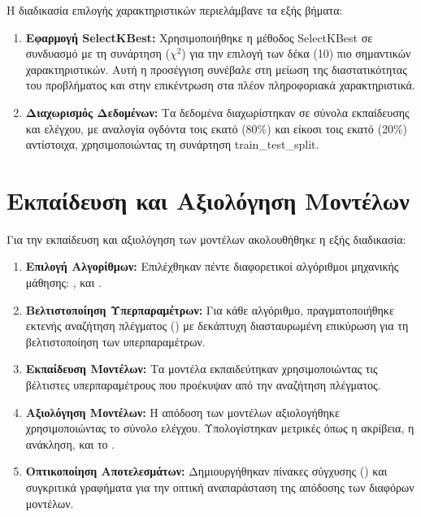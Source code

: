 Η διαδικασία επιλογής χαρακτηριστικών περιελάμβανε τα εξής βήματα:
\begin{enumerate}
  \item
    \textbf{Εφαρμογή \textlatin{SelectKBest}:} Χρησιμοποιήθηκε η μέθοδος
    \textlatin{SelectKBest} σε συνδυασμό με τη συνάρτηση (${\chi}^2$) για
    την επιλογή των δέκα (10) πιο σημαντικών χαρακτηριστικών. Αυτή η
    προσέγγιση συνέβαλε στη μείωση της διαστατικότητας του προβλήματος και
    στην επικέντρωση στα πλέον πληροφοριακά χαρακτηριστικά.

  \item
    \textbf{Διαχωρισμός Δεδομένων:} Τα δεδομένα διαχωρίστηκαν σε σύνολα
    εκπαίδευσης και ελέγχου, με αναλογία ογδόντα τοις εκατό (80\%) και
    είκοσι τοις εκατό (20\%) αντίστοιχα, χρησιμοποιώντας τη συνάρτηση
    \textlatin{train\_test\_split}.
\end{enumerate}

\section{Εκπαίδευση και Αξιολόγηση Μοντέλων}

Για την εκπαίδευση και αξιολόγηση των μοντέλων ακολουθήθηκε η εξής
διαδικασία:
\begin{enumerate}
  \item
    \textbf{Επιλογή Αλγορίθμων:} Επιλέχθηκαν πέντε διαφορετικοί
    αλγόριθμοι μηχανικής μάθησης: , και .
  \item
    \textbf{Βελτιστοποίηση Υπερπαραμέτρων:} Για κάθε αλγόριθμο,
    πραγματοποιήθηκε εκτενής αναζήτηση πλέγματος () με
    δεκάπτυχη διασταυρωμένη επικύρωση για τη βελτιστοποίηση των
    υπερπαραμέτρων.
  \item
    \textbf{Εκπαίδευση Μοντέλων:} Τα μοντέλα εκπαιδεύτηκαν χρησιμοποιώντας
    τις βέλτιστες υπερπαραμέτρους που προέκυψαν από την αναζήτηση
    πλέγματος.
  \item
    \textbf{Αξιολόγηση Μοντέλων:} Η απόδοση των μοντέλων αξιολογήθηκε
    χρησιμοποιώντας το σύνολο ελέγχου. Υπολογίστηκαν μετρικές όπως η
    ακρίβεια, η ανάκληση, και το .
  \item
    \textbf{Οπτικοποίηση Αποτελεσμάτων:} Δημιουργήθηκαν πίνακες σύγχυσης
    () και συγκριτικά γραφήματα για την οπτική
    αναπαράσταση της απόδοσης των διαφόρων μοντέλων.
\end{enumerate}


